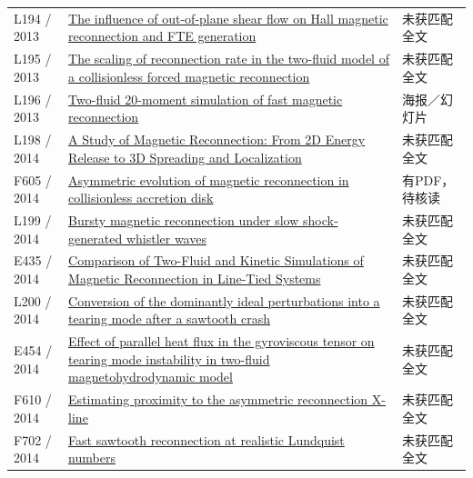 \begin{longtable}{P{24mm}P{97mm}P{27mm}}
L194 / 2013 & \href{https://doi.org/10.1002/jgra.50417}{The influence of out‐of‐plane shear flow on Hall magnetic reconnection and FTE generation} & 未获匹配全文\\

L195 / 2013 & \href{https://doi.org/10.1017/s0022377812001201}{The scaling of reconnection rate in the two-fluid model of a collisionless forced magnetic reconnection} & 未获匹配全文\\

L196 / 2013 & \href{https://lirias.kuleuven.be/handle/123456789/463177}{Two-fluid 20-moment simulation of fast magnetic reconnection} & 海报／幻灯片\\

L198 / 2014 & \href{https://doi.org/10.33915/etd.6627}{A Study of Magnetic Reconnection: From 2D Energy Release to 3D Spreading and Localization} & 未获匹配全文\\

F605 / 2014 & \href{https://doi.org/10.1063/1.4875739}{Asymmetric evolution of magnetic reconnection in collisionless accretion disk} & 有PDF，待核读\\

L199 / 2014 & \href{https://doi.org/10.1002/2014ja020190}{Bursty magnetic reconnection under slow shock‐generated whistler waves} & 未获匹配全文\\

E435 / 2014 & \href{https://agu.confex.com/agu/fm14/webprogram/Paper27518.html}{Comparison of Two-Fluid and Kinetic Simulations of Magnetic Reconnection in Line-Tied Systems} & 未获匹配全文\\

L200 / 2014 & \href{https://doi.org/10.1063/1.4902106}{Conversion of the dominantly ideal perturbations into a tearing mode after a sawtooth crash} & 未获匹配全文\\

E454 / 2014 & \href{http://absimage.aps.org/image/DPP14/MWS_DPP14-2014-000895.pdf}{Effect of parallel heat flux in the gyroviscous tensor on tearing mode instability in two-fluid magnetohydrodynamic model} & 未获匹配全文\\

F610 / 2014 & \href{https://scholars.unh.edu/dissertation/2170}{Estimating proximity to the asymmetric reconnection X-line} & 未获匹配全文\\

F702 / 2014 & \href{https://doi.org/10.1088/0741-3335/57/1/014017}{Fast sawtooth reconnection at realistic Lundquist numbers} & 未获匹配全文\\


\end{longtable}
